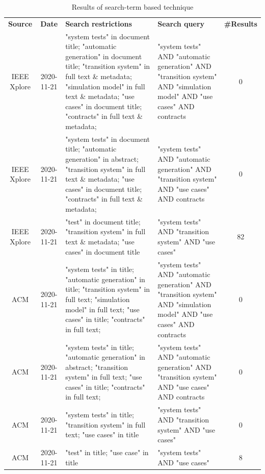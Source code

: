 \begin{longtable}[h]{c|c|p{}|p{}|c}
		\caption{Results of search-term based technique}
		\label{search-term}\setlength{\tabcolsep}{1em}\\
		\hline
		\textbf{Source} & \textbf{Date} & \textbf{Search restrictions} & \textbf{Search query} & \textbf{\#Results} \\
		\hline
		IEEE Xplore & 2020-11-21 & "system tests" in document title; "automatic generation" in document title; "transition system" in full text \& metadata; "simulation model" in full text \& metadata; "use cases" in document title; "contracts" in full text \& metadata; & "system tests" AND "automatic generation" AND "transition system" AND "simulation model" AND "use cases" AND contracts & 0 \\
		\hline
		IEEE Xplore & 2020-11-21 & "system tests" in document title; "automatic generation" in abstract; "transition system" in full text \& metadata; "use cases" in document title; "contracts" in full text \& metadata; & "system tests" AND "automatic generation" AND "transition system" AND "use cases" AND contracts & 0 \\
		\hline
		IEEE Xplore & 2020-11-21 & "test" in document title; "transition system" in full text \& metadata; "use cases" in document title & "system tests" AND "transition system" AND "use cases" & 82 \\
		\hline
		ACM & 2020-11-21 & "system tests" in title; "automatic generation" in title; "transition system" in full text; "simulation model" in full text; "use cases" in title; "contracts" in full text; & "system tests" AND "automatic generation" AND "transition system" AND "simulation model" AND "use cases" AND contracts & 0 \\
		\hline
		ACM & 2020-11-21 & "system tests" in title; "automatic generation" in abstract; "transition system" in full text; "use cases" in title; "contracts" in full text; & "system tests" AND "automatic generation" AND "transition system" AND "use cases" AND contracts & 0 \\
		\hline
		ACM & 2020-11-21 & "system tests" in title; "transition system" in full text; "use cases" in title & "system tests" AND "transition system" AND "use cases" & 0 \\
		\hline
		ACM & 2020-11-21 & "test" in title; "use case" in title & "system tests" AND "use cases" & 8 \\
		\hline
\end{longtable}


